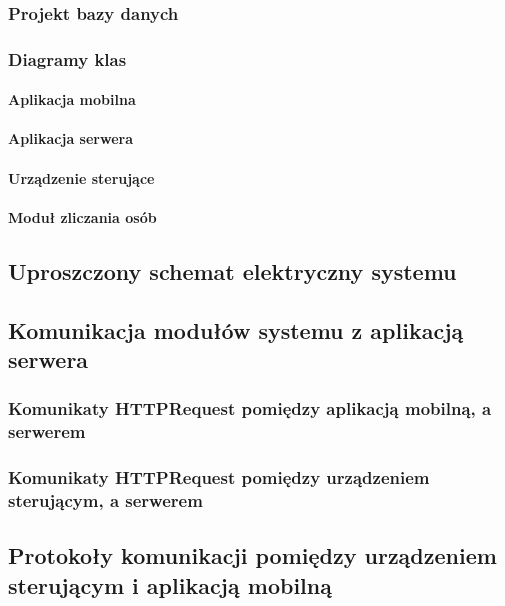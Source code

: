 	\subsubsection{Projekt bazy danych} 
	
	\subsubsection{Diagramy klas} 
	
		\paragraph{Aplikacja mobilna}
		\paragraph{Aplikacja serwera}
		\paragraph{Urządzenie sterujące}
		\paragraph{Moduł zliczania osób}

\newpage		
\subsection{Uproszczony schemat elektryczny systemu}

\newpage
\subsection{Komunikacja modułów systemu z aplikacją  serwera}

	\subsubsection{Komunikaty HTTPRequest pomiędzy aplikacją mobilną, \newline a serwerem}
	\subsubsection{Komunikaty HTTPRequest pomiędzy urządzeniem sterującym, a serwerem}
	
\newpage
\subsection{Protokoły komunikacji pomiędzy urządzeniem \newline sterującym i aplikacją mobilną}

